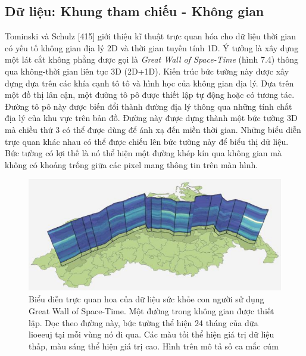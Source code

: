 \subsection{Dữ liệu: Khung tham chiếu - Không gian}
Tominski và Schulz [415] giới thiệu kĩ thuật trực quan hóa cho dữ liệu thời gian có yếu tố không gian địa lý 2D và thời gian tuyến tính 1D. Ý tưởng là xây dựng một lát cắt không phẳng được gọi là \textit{Great Wall of Space-Time} (hình 7.4) thông qua không-thời gian liên tục 3D (2D+1D). Kiến trúc bức tường này được xây dựng dựa trên các khía cạnh tô tô và hình học của không gian địa lý. Dựa trên một đồ thị lân cận, một đường tô pô được thiết lập tự động hoặc có tương tác. Đường tô pô này được biến đổi thành đường địa lý thông qua những tính chất địa lý của khu vực trên bản đồ. Đường này được dựng thành một bức tường 3D mà chiều thứ 3 có thể được dùng để ánh xạ đến miền thời gian. Những biểu diễn trực quan khác nhau có thể được chiếu lên bức tường này để biểu thị dữ liệu. Bức tường có lợi thế là nó thể hiện một đường khép kín qua không gian mà không có khoảng trống giữa các pixel mang thông tin trên màn hình. 
\begin{figure}[H] %
    \centering %
    \includegraphics[width=1\textwidth]{assets/fig_7_4.png} 
    \caption{Biểu diễn trực quan hoa của dữ liệu sức khỏe con người sử dụng Great Wall of Space-Time. Một đường trong không gian được thiết lập. Dọc theo đường này, bức tường thể hiện 24 tháng của dữa lioeeuj tại mỗi vùng nó đi qua. Các màu tối thể hiện giá trị dữ liệu thấp, màu sáng thể hiện giá trị cao. Hình trên mô tả số ca mắc cúm } %
    \label{fig:f7.4}
\end{figure}